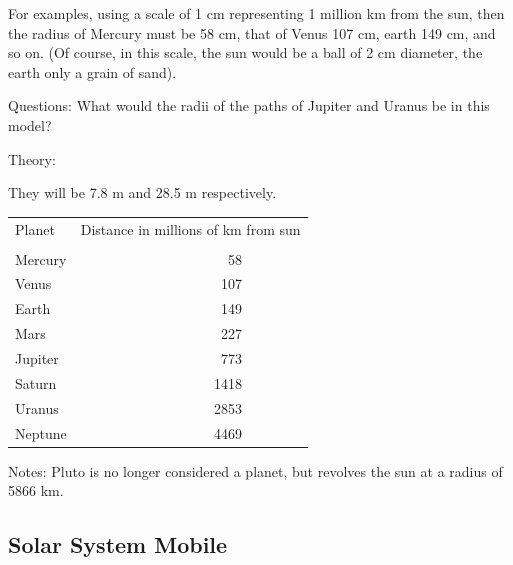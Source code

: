 \begin{multicols}{2}
\begin{description*}
{For examples, using a scale of 1 cm representing 1 million km from the sun, then the radius of Mercury must be 58 cm, that of Venus 107 cm, earth 149 cm, and so on. (Of course, in this scale, the sun would be a ball of 2 cm diameter, the earth only a grain of sand).}
\item[Questions:]{What would the radii of the paths of Jupiter and Uranus be in this model?}
\item[Theory:]{They will be 7.8 m and 28.5 m respectively.
\begin{center}
\begin{tabular}{l r r}
\multicolumn{1}{l}{Planet} & \multicolumn{2}{p{0.2\textwidth}}{Distance in millions of km from sun}\\
&\\
Mercury & 58&\\
Venus & 107&\\
Earth & 149&\\
Mars & 227&\\
Jupiter & 773&\\
Saturn & 1418&\\
Uranus & 2853&\\
Neptune & 4469&
\end{tabular}
\end{center}}
\item[Notes:]{Pluto is no longer considered a planet, but revolves the sun at a radius of 5866 km.}
\end{description*}

\subsection{Solar System Mobile}



\end{multicols}
